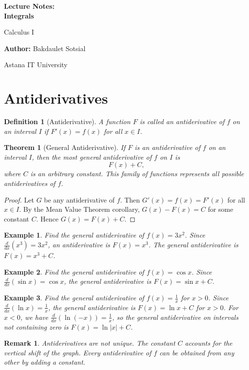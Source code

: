 \documentclass[11pt,a4paper]{article}
\newtheorem{example}{Example}
\newtheorem{theorem}{Theorem}
\newtheorem{definition}{Definition}
\newtheorem{remark}{Remark}
\begin{document}
\begin{titlepage}
\centering
\vspace*{4cm}
{\Huge\bfseries Lecture Notes:\\ Integrals\par}
\vspace{1cm}
{\Large Calculus I\par}
\vspace{2cm}
{\large \textbf{Author:} Bakdaulet Sotsial\par}
\vspace{1cm}
\vfill
{\small Astana IT University \par}
\vspace*{2cm}
\end{titlepage}
\tableofcontents
\newpage
\section{Antiderivatives}
\begin{definition}[Antiderivative]
A function $F$ is called an \textit{antiderivative} of $f$ on an interval $I$ if $F'(x) = f(x)$ for all $x \in I$.
\end{definition}
\begin{theorem}[General Antiderivative]
If $F$ is an antiderivative of $f$ on an interval $I$, then the most general antiderivative of $f$ on $I$ is
\[
F(x) + C,
\]
where $C$ is an arbitrary constant. This family of functions represents all possible antiderivatives of $f$.
\end{theorem}
\begin{proof}
Let $G$ be any antiderivative of $f$. Then $G'(x) = f(x) = F'(x)$ for all $x \in I$. By the Mean Value Theorem corollary, $G(x) - F(x) = C$ for some constant $C$. Hence $G(x) = F(x) + C$.
\end{proof}
\begin{example}
Find the general antiderivative of $f(x) = 3x^2$.
Since $\frac{d}{dx}(x^3) = 3x^2$, an antiderivative is $F(x) = x^3$. The general antiderivative is $F(x) = x^3 + C$.
\end{example}
\begin{example}
Find the general antiderivative of $f(x) = \cos x$.
Since $\frac{d}{dx}(\sin x) = \cos x$, the general antiderivative is $F(x) = \sin x + C$.
\end{example}
\begin{example}
Find the general antiderivative of $f(x) = \frac{1}{x}$ for $x > 0$.
Since $\frac{d}{dx}(\ln x) = \frac{1}{x}$, the general antiderivative is $F(x) = \ln x + C$ for $x > 0$. For $x < 0$, we have $\frac{d}{dx}(\ln(-x)) = \frac{1}{x}$, so the general antiderivative on intervals not containing zero is $F(x) = \ln|x| + C$.
\end{example}
\begin{remark}
Antiderivatives are not unique. The constant $C$ accounts for the vertical shift of the graph. Every antiderivative of $f$ can be obtained from any other by adding a constant.
\end{remark}
\end{document}
